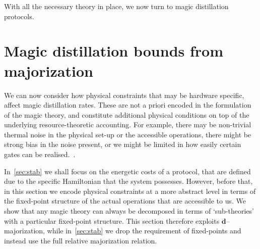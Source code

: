 \documentclass[pra,
aps,
twocolumn,
superscriptaddress,
groupedaddress,
nofootinbib,
reprint
]{revtex4-1}
\begin{document}
With all the necessary theory in place, we now turn to magic distillation protocols.

\newpage
\section{Magic distillation bounds from majorization}
\label{sec:frag}

We can now consider how physical constraints that may be hardware specific, affect magic distillation rates. These are not a priori encoded in the formulation of the magic theory, and constitute additional physical conditions on top of the underlying resource-theoretic accounting. For example, there may be non-trivial thermal noise in the physical set-up or the accessible operations, there might be strong bias in the noise present, or we might be limited in how easily certain gates can be realised.~\cite{Aliferis_2008, Stephens_2013, Li_2015, Babbush_2018, Tuckett_2019, Guillaud_2019, Fowler_2019}.

In~\cref{sec:stab} we shall focus on the energetic costs of a protocol, that are defined due to the specific Hamiltonian that the system possesses. However, before that, in this section we encode physical constraints at a more abstract level in terms of the fixed-point structure of  the actual operations that are accessible to us. We show that any magic theory can always be decomposed in terms of `sub-theories' with a particular fixed-point structure. This section therefore exploits $\mathbf{d}$--majorization, while in~\cref{sec:stab} we drop the requirement of fixed-points and instead use the full relative majorization relation.
 
\end{document}
